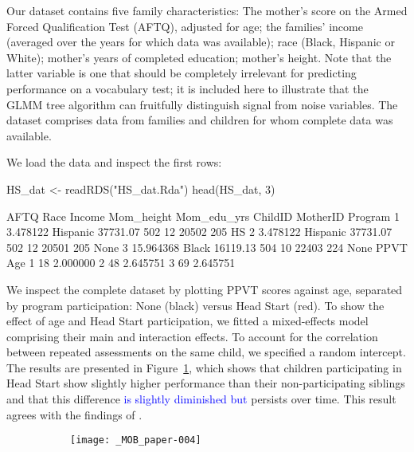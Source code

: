 \documentclass[doc,floatsintext,natbib]{apa7}
\newcommand{\edc}[1]{\textcolor{blue}{#1}}
\begin{document}
Our dataset contains five family characteristics: The mother's score on the Armed Forced Qualification Test (AFTQ), adjusted for age; the families' income (averaged over the years for which data was available); race (Black, Hispanic or White); mother's years of completed education; mother's height. Note that the latter variable is one that should be completely irrelevant for predicting performance on a vocabulary test; it is included here to illustrate that the GLMM tree algorithm can fruitfully distinguish signal from noise variables. The dataset comprises data from families and children for whom complete data was available. 

We load the data and inspect the first rows:

\begin{Schunk}
\begin{Sinput}
 HS_dat <- readRDS("HS_dat.Rda")
 head(HS_dat, 3)
\end{Sinput}
\begin{Soutput}
       AFTQ     Race   Income Mom_height Mom_edu_yrs ChildID MotherID Program
1  3.478122 Hispanic 37731.07        502          12   20502      205      HS
2  3.478122 Hispanic 37731.07        502          12   20501      205    None
3 15.964368    Black 16119.13        504          10   22403      224    None
  PPVT      Age
1   18 2.000000
2   48 2.645751
3   69 2.645751
\end{Soutput}
\end{Schunk}

We inspect the complete dataset by plotting PPVT scores against age, separated by program participation: None (black) versus Head Start (red). To show the effect of age and Head Start participation, we fitted a mixed-effects model comprising their main and interaction effects. To account for the correlation between repeated assessments on the same child, we specified a random intercept. The results are presented in Figure~\ref{fig:global_lmm}, which shows that children participating in Head Start show slightly higher performance than their non-participating siblings and that this difference \edc{is slightly diminished but} persists over time. This result agrees with the findings of \cite{Demi09}.

\begin{figure}%
\caption{}
\begin{subfigure}{.7\textwidth}
\texttt{[image: \_MOB\_paper-004]}
\end{subfigure}
\label{fig:global_lmm}
\end{figure}%
\end{document}
